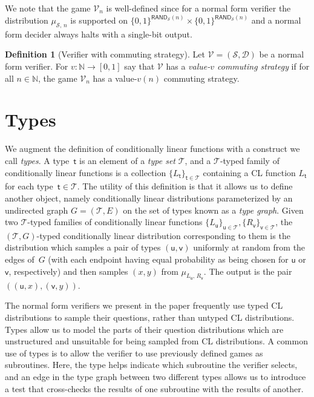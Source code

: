 \documentclass[11pt]{article}
\theoremstyle{definition}
\newtheorem{definition}[theorem]{Definition}
\newcommand{\N}{\ensuremath{\mathbb{N}}}
\newcommand{\sampler}{\mathcal{S}}
\newcommand{\decider}{\mathcal{D}}
\newcommand{\verifier}{\mathcal{V}}
\newcommand{\type}{\mathcal{T}}
\newcommand{\tvarstyle}[1]{\mathsf{#1}}
\newcommand{\tvar}{\ensuremath{\tvarstyle{t}}}
\newcommand{\lvar}{\ensuremath{\tvarstyle{u}}}
\newcommand{\rvar}{\ensuremath{\tvarstyle{v}}}
\newcommand{\RAND}{\mathsf{RAND}}
\begin{document}
We note that the game $\verifier_n$ is well-defined since for a normal form
verifier the distribution $\mu_{\sampler,\, n}$ is supported on
$\{0,1\}^{\RAND_\sampler(n)}\times \{0,1\}^{\RAND_\sampler(n)}$ and a normal
form decider always halts with a single-bit output.

\begin{definition}[Verifier with commuting strategy]
  \label{def:comm-with-checker}
  Let $\verifier = (\sampler, \decider)$ be a normal form verifier.
  For $v:\N\to [0,1]$ say that $\verifier$ has a \emph{value-$v$ commuting
    strategy} if for all $n \in \N$, the game $\verifier_n$ has a value-$v(n)$
  commuting strategy.
\end{definition}


\section{Types}
\label{sec:types}

We augment the definition of conditionally linear functions with a construct
we call \emph{types}.
A type~$\tvar$ is an element of a \emph{type set} $\type$, and a $\type$-typed
family of conditionally linear functions is a collection
$\{L_\tvar\}_{\tvar\in\type}$ containing a CL function $L_\tvar$ for each
type~$\tvar\in\type$.
The utility of this definition is that it allows us to define another object,
namely conditionally linear distributions parameterized by an undirected graph
$G = (\type, E)$ on the set of types known as a \emph{type graph}.
Given two $\type$-typed families of conditionally linear functions
$\{L_\lvar\}_{\lvar\in\type}, \{R_\rvar\}_{\rvar\in\type}$, the $(\type,
G)$-typed conditionally linear distribution corresponding to them is the
distribution which samples a pair of types $(\lvar, \rvar)$ uniformly at random
from the edges of~$G$ (with each endpoint having equal probability as being
chosen for $\lvar$ or $\rvar$, respectively) and then samples $(x, y)$ from
$\mu_{L_\lvar,\, R_\rvar}$.
The output is the pair $( (\lvar, x), (\rvar, y) )$.

The normal form verifiers we present in the paper frequently use typed CL
distributions to sample their questions, rather than untyped CL distributions.
Types allow us to model the parts of their question distributions which are
unstructured and unsuitable for being sampled from CL distributions.
A common use of types is to allow the verifier to use previously defined games
as subroutines.
Here, the type helps indicate which subroutine the verifier selects, and an edge
in the type graph between two different types allows us to introduce a test that
cross-checks the results of one subroutine with the results of another.
\end{document}
